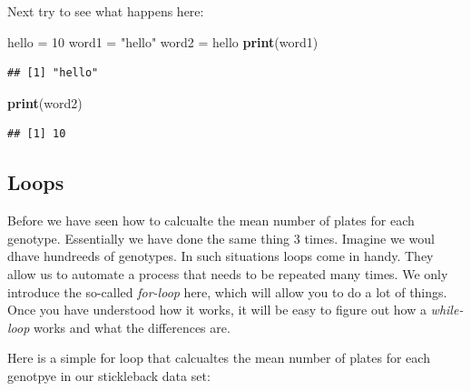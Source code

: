 \documentclass[]{article}
\newenvironment{Shaded}{\begin{snugshade}}{\end{snugshade}}
\newcommand{\DecValTok}[1]{\textcolor[rgb]{0.00,0.00,0.81}{#1}}
\newcommand{\KeywordTok}[1]{\textcolor[rgb]{0.13,0.29,0.53}{\textbf{#1}}}
\newcommand{\NormalTok}[1]{#1}
\newcommand{\StringTok}[1]{\textcolor[rgb]{0.31,0.60,0.02}{#1}}
\begin{document}
Next try to see what happens here:

\begin{Shaded}
\begin{Highlighting}[]
\NormalTok{hello =}\StringTok{ }\DecValTok{10}
\NormalTok{word1 =}\StringTok{ "hello"}
\NormalTok{word2 =}\StringTok{ }\NormalTok{hello}
\KeywordTok{print}\NormalTok{(word1)}
\end{Highlighting}
\end{Shaded}

\begin{verbatim}
## [1] "hello"
\end{verbatim}

\begin{Shaded}
\begin{Highlighting}[]
\KeywordTok{print}\NormalTok{(word2)}
\end{Highlighting}
\end{Shaded}

\begin{verbatim}
## [1] 10
\end{verbatim}

\hypertarget{loops}{%
\subsection{Loops}\label{loops}}

Before we have seen how to calcualte the mean number of plates for each
genotype. Essentially we have done the same thing 3 times. Imagine we
woul dhave hundreeds of genotypes. In such situations loops come in
handy. They allow us to automate a process that needs to be repeated
many times. We only introduce the so-called \emph{for-loop} here, which
will allow you to do a lot of things. Once you have understood how it
works, it will be easy to figure out how a \emph{while-loop} works and
what the differences are.

Here is a simple for loop that calcualtes the mean number of plates for
each genotpye in our stickleback data set:
\end{document}
